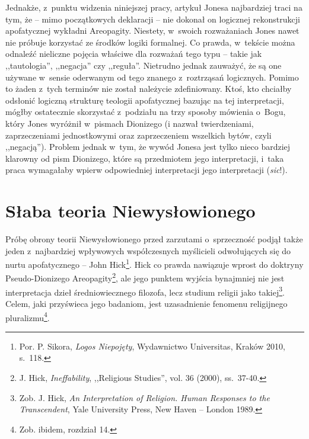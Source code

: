 Jednakże, z~punktu widzenia niniejszej pracy, artykuł Jonesa najbardziej traci na tym, że -- mimo początkowych deklaracji -- nie dokonał on logicznej rekonstrukcji apofatycznej wykładni Areopagity. Niestety, w~swoich rozważaniach Jones nawet nie próbuje korzystać ze środków logiki formalnej. Co prawda, w~tekście można odnaleźć nieliczne pojęcia właściwe dla rozważań tego typu -- takie jak ,,tautologia'', ,,negacja'' czy ,,reguła''. Nietrudno jednak zauważyć, że są one używane w~sensie
oderwanym
od tego znanego z~roztrząsań logicznych. Pomimo to żaden z~tych terminów nie został należycie zdefiniowany. Ktoś, kto chciałby odsłonić logiczną strukturę teologii apofatycznej bazując na tej interpretacji, mógłby ostatecznie skorzystać z~podziału na trzy sposoby mówienia o~Bogu, który Jones wyróżnił w~pismach Dionizego (i nazwał twierdzeniami, zaprzeczeniami jednostkowymi oraz zaprzeczeniem wszelkich bytów, czyli ,,negacją''). Problem jednak w~tym, że wywód Jonesa jest tylko nieco bardziej klarowny od pism Dionizego, które są przedmiotem jego interpretacji, i~taka praca wymagałaby wpierw odpowiedniej interpretacji jego interpretacji (\textit{sic}!).


\chapter{Słaba teoria Niewysłowionego}\label{sil-slabatn}

Próbę obrony teorii Niewysłowionego przed zarzutami o~sprzeczność podjął także jeden z~najbardziej wpływowych współczesnych myślicieli odwołujących się do nurtu apofatycznego -- John Hick\footnote{Por. P. Sikora, \textit{Logos Niepojęty}, Wydawnictwo Universitas, Kraków 2010, s.~118.}. Hick co prawda nawiązuje wprost do doktryny Pseudo-Dionizego Areopagity\footnote{J. Hick, \textit{Ineffability}, ,,Religious Studies'', vol. 36 (2000), ss.~37-40.}, ale jego punktem wyjścia bynajmniej nie jest interpretacja dzieł średniowiecznego filozofa, lecz studium religii jako takiej\footnote{Zob. J. Hick, \textit{An Interpretation of Religion. Human Responses to the Transcendent}, Yale University Press, New Haven -- London 1989.}. Celem, jaki przyświeca jego badaniom, jest uzasadnienie fenomenu religijnego pluralizmu\footnote{Zob. ibidem, rozdział 14.}.

